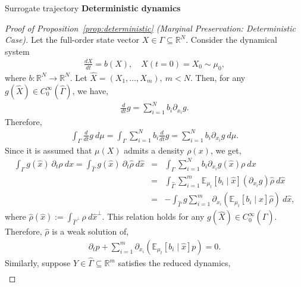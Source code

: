 \documentclass[11pt, a4paper, oneside, reqno]{amsart}
\makeatletter
\def\subsubsection{\@startsection{subsubsection}{3}%
	\z@{.5\linespacing\@plus.7\linespacing}{.5\linespacing}%
	{\normalfont\itshape}}
\makeatother
\begin{document}
\subsubsection{Surrogate trajectory}
\noindent\textbf{Deterministic dynamics}\label{app:proof x ode}

\begin{proof}[Proof of Proposition~\ref{prop:deterministic} (Marginal Preservation: Deterministic Case)]
    Let the full-order state vector $X\in\Gamma \subseteq \mathbb{R}^N$. Consider the dynamical system 
    \begin{eqnarray}
        \frac{dX}{dt} = b(X), \quad X(t=0) = X_0 \sim \mu_0,
    \end{eqnarray}
    where $b:\mathbb{R}^N\to\mathbb{R}^N$. Let $\hat{X}=(X_1,\dots,X_m), \ m<N$.
    Then, for any $g(\hat{X})\in C_0^\infty(\hat{\Gamma})$, we have,
    \begin{eqnarray}
        \frac{d}{dt}g = \sum_{i=1}^N b_i\partial_{x_i}g.
    \end{eqnarray}
    Therefore,
    \begin{eqnarray}
        \int_\Gamma \frac{d}{dt}g \ d\mu = \int_\Gamma \sum_{i=1}^N b_i        \frac{d}{dt}g = \sum_{i=1}^N b_i\partial_{x_i}g \ d\mu.
    \end{eqnarray}
    Since it is assumed that $\mu(X)$ admits a density $\rho(x)$, we get,
    \begin{eqnarray}
        \int_\Gamma g(\hat{x}) \ \partial_t\rho \ dx =  \int_{\hat{\Gamma}} g(\hat{x}) \ \partial_t\hat{\rho} \ d\hat{x} &=& \int_\Gamma \sum_{i=1}^N b_i\partial_{x_i}g(\hat{x}) \rho \ dx\nonumber\\
        &=&\int_{\hat{\Gamma}} \sum_{i=1}^m\mathbb{E}_{\mu_t}[b_i\mid \hat{x}] (\partial_{x_i}g) \hat{\rho}\ d\hat{x}\nonumber\\
        &=& -\int_{\hat{\Gamma}} g \sum_{i=1}^m\partial_{x_i}(\mathbb{E}_{\mu_t}[b_i\mid \hat{x}] \hat{\rho})\ d\hat{x},
    \end{eqnarray}
    where $\hat{\rho}(\hat{x}):=\int_{\hat{\Gamma}^\perp}\rho\ d\hat{x}^\perp$. This relation holds for any $g(\hat{X})\in C_0^\infty(\hat{\Gamma})$. Therefore, $\hat{\rho}$ is a weak solution of, 
    \begin{eqnarray}\label{eq:proba flow reference}
        \partial_tp+ \sum_{i=1}^m\partial_{x_i}(\mathbb{E}_{\mu_t}[b_i\mid \hat{x}] p)=0.
    \end{eqnarray}
    Similarly, suppose $Y\in\hat{\Gamma}\subseteq\mathbb{R}^m$ satisfies the reduced dynamics,
    \begin{eqnarray}

\end{eqnarray}
\end{proof}
\end{document}
